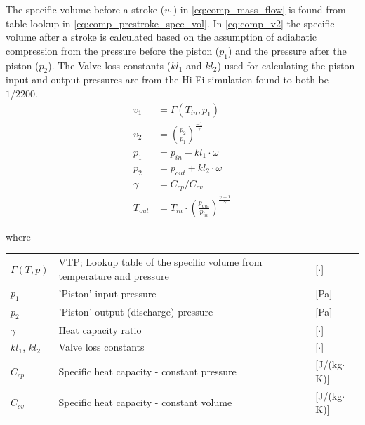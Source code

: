 \medskip
The specific volume before a stroke ($v_1$) in \cref{eq:comp_mass_flow} is found from table lookup in \cref{eq:comp_prestroke_spec_vol}. In \cref{eq:comp_v2} the specific volume after a stroke is calculated based on the assumption of adiabatic compression from the pressure before the piston ($p_1$) and the pressure after the piston ($p_2$). The Valve loss constants ($kl_1$ and $kl_2$) used for calculating the piston input and output pressures are from the Hi-Fi simulation found to both be $1/2200$.
\begin{align}
	v_1     & = \Gamma(T_{in},p_{1}) \label{eq:comp_prestroke_spec_vol}                   \\
	v_2     & = \left(\frac{p_2}{p_1}\right)^{\frac{-1}{\gamma}} \label{eq:comp_v2}                         \\
	p_1     & = p_{in} - kl_1 \cdot \omega \label{eq:comp_p1}                                               \\
	p_2     & = p_{out} + kl_2 \cdot \omega \label{eq:comp_p2}                                              \\
	\gamma  & = C_{cp}/C_{cv} \label{eq:comp_gamma}                                                            \\
	T_{out} & = T_{in}\cdot \left(\frac{p_{out}}{p_{in}}\right)^{\frac{\gamma-1}{\gamma}} \label{eq:comp_Tout}
\end{align}

where
\begin{center}
	\begin{tabular}{l p{10cm} l}
		$\Gamma(T,p)$   & VTP; Lookup table of the specific volume from temperature and pressure & [$\cdot$]                         \\
		$p_1$           & 'Piston' input pressure                                                & [\si{Pa}]                         \\
		$p_2$           & 'Piston' output (discharge) pressure                                   & [\si{Pa}]                         \\
		$\gamma$        & Heat capacity ratio                                                    & [$ \cdot $]                       \\
		$ kl_1$, $kl_2$ & Valve loss constants                                                   & [$ \cdot $]                       \\
		$C_{cp}$        & Specific heat capacity - constant pressure                             & [\si{J}/(\si{kg}$ \cdot $\si{K})] \\
		$C_{cv} $       & Specific heat capacity - constant volume                               & [\si{J}/(\si{kg}$ \cdot $\si{K})]
	\end{tabular}
\end{center}


